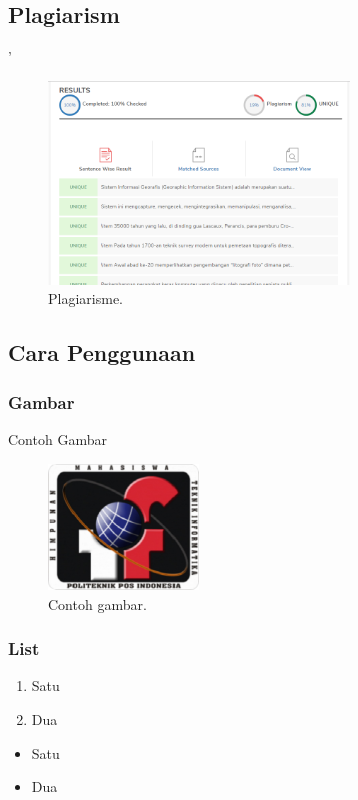 \subsection{Plagiarism}'\begin{figure}[H]
	\includegraphics[width=8cm]{figures/Tugas1/1174089/plagiarisme.png}
	\centering
	\caption{Plagiarisme.}
\end{figure}	

\subsection{Cara Penggunaan}
\subsubsection{Gambar}

\hfill\break


Contoh Gambar
\begin{figure}[H]
	\includegraphics[width=4cm]{figures/himatif.png}
	\centering
	\caption{Contoh gambar.}
\end{figure}

\subsubsection{List}
\begin{enumerate}
	\item Satu
	\item Dua
\end{enumerate}

\begin{itemize}
	\item Satu
	\item Dua
\end{itemize}

